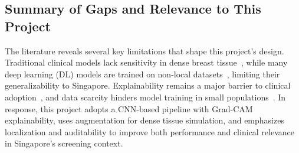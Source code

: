 \documentclass[12pt]{article}
\begin{document}
\subsection{Summary of Gaps and Relevance to This Project}

The literature reveals several key limitations that shape this project’s design. Traditional clinical models lack sensitivity in dense breast tissue~\cite{1}, while many deep learning (DL) models are trained on non-local datasets~\cite{1,6}, limiting their generalizability to Singapore. Explainability remains a major barrier to clinical adoption~\cite{3,5}, and data scarcity hinders model training in small populations~\cite{4}. In response, this project adopts a CNN-based pipeline with Grad-CAM explainability, uses augmentation for dense tissue simulation, and emphasizes localization and auditability to improve both performance and clinical relevance in Singapore’s screening context.
\end{document}
